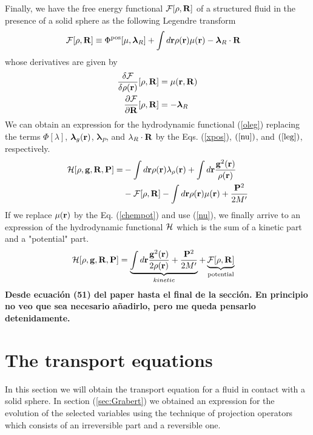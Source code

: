 \documentclass[a4paper,openright,12pt]{book}
\newcommand{\Note}[1]{{\bf \color{red}#1}}    %
\begin{document}
Finally, we have the free energy functional ${\cal  F}[\rho,{\bf R}]$ of a structured fluid in the presence of a solid sphere as the following Legendre transform
\begin{align}
  {\cal F}[\rho,{\bf R}]&\equiv  \Phi^{\rm pos}[\mu,\boldsymbol{\lambda}_R]
+
\int d{\bf r}\rho({\bf r})\mu({\bf r})-\boldsymbol{\lambda}_R\cdot{\bf R}
\label{leg}
\end{align}
whose derivatives are given by 
\begin{align}
   \frac{\delta {\cal F}}{\delta\rho({\bf r})}[\rho,{\bf R}] &=\mu({\bf r},{\bf R})
\nonumber\\
   \frac{\partial {\cal F}}{\partial{\bf R}}[\rho,{\bf R}] &=-\boldsymbol{\lambda}_R
\label{Fd2}
\end{align}
We can obtain an expression for the  hydrodynamic functional (\ref{oleg}) replacing the terms $\Phi[\lambda]$, $\boldsymbol{\lambda}_g({\bf r})$, $\boldsymbol{\lambda}_P$, and $\lambda_R\cdot{\bf R}$ by the Eqs. (\ref{xpos}), $(\ref{nu})$, and $(\ref{leg})$, respectively. 
\begin{align}
  {\cal H}[\rho,{\bf g},{\bf R},{\bf P}] =& 
  -\int d{\bf r} \rho({\bf r})\lambda_{\rho}({\bf r}) 
  +\int d{\bf r}\frac{{\bf g}^2({\bf r})}{\rho({\bf r})} 
  \nonumber\\
  &- {\cal F}[\rho,{\bf R}] -\int d{\bf r}\rho({\bf r})\mu({\bf r}) + \frac{{\bf P}^2}{2M'}
\end{align}
If we replace $\mu({\bf r})$ by the Eq. (\ref{chempot}) and use (\ref{nu}), we finally arrive to an expression of the hydrodynamic functional ${\cal H}$ which is the sum of a kinetic part and a "potential" part. 
\begin{align}
  {\cal H}[\rho,{\bf g},{\bf R},{\bf P}] &=   
  \underbrace{\int d{\bf r}\frac{{\bf g}^2({\bf r})}{2\rho({\bf r})} +\frac{{\bf P}^2}{2M'}}_{kinetic}
  +\underbrace{{\cal F}[\rho,{\bf R}]}_{\rm potential}
\label{oleg2}
\end{align}
\Note{Desde ecuación (51) del paper hasta el final de la sección. En principio no veo que sea necesario añadirlo, pero me queda pensarlo detenidamente.}

\section{The transport equations}
In this section we will obtain the transport equation for a fluid in contact with a solid sphere. In section (\ref{sec:Grabert}) we obtained an expression for the evolution of the selected variables using the technique of projection operators which consists of an irreversible part and a reversible one. 
\end{document}
